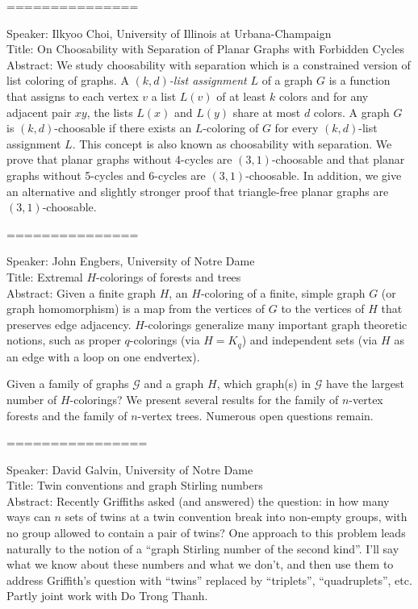 \documentclass[11pt]{article}
\begin{document}
===============

Speaker: Ilkyoo Choi, University of Illinois at Urbana-Champaign\\
Title:  On Choosability with Separation of Planar Graphs with Forbidden
Cycles \\
Abstract:  We study choosability with separation which is a constrained
version of list coloring of graphs. A \emph{$(k,d)$-list assignment} $L$ of
a graph $G$ is a function that assigns to each vertex $v$ a list $L(v)$ of
at least $k$ colors and for any adjacent pair $xy$, the lists $L(x)$ and
$L(y)$ share at most $d$ colors. A graph $G$ is $(k,d)$-choosable if there
exists an $L$-coloring of $G$ for every $(k,d)$-list assignment $L$. This
concept is also known as choosability with separation. We prove that planar
graphs without 4-cycles are $(3,1)$-choosable and that planar graphs without
5-cycles and 6-cycles are $(3,1)$-choosable. In addition, we give an
alternative and slightly stronger proof that triangle-free planar graphs are
$(3,1)$-choosable. 


===============

Speaker: John Engbers, University of Notre Dame\\
Title:  Extremal $H$-colorings of forests and trees \\
Abstract:  Given a finite graph $H$, an $H$-coloring of a finite, simple
graph $G$ (or graph homomorphism) is a map from the vertices of $G$ to the
vertices of $H$ that preserves edge adjacency.  $H$-colorings generalize
many important graph theoretic notions, such as proper $q$-colorings (via $H
= K_{q}$) and independent sets (via $H$ as an edge with a loop on one
endvertex).

Given a family of graphs $\mathcal{G}$ and a graph $H$, which graph(s) in
$\mathcal{G}$ have the largest number of $H$-colorings?  We present several
results for the family of $n$-vertex forests and the family of $n$-vertex
trees.  Numerous open questions remain.


================

Speaker: David Galvin, University of Notre Dame\\
Title: Twin conventions and graph Stirling numbers \\
Abstract:  Recently Griffiths asked (and answered) the question: in how many
ways can $n$ sets of twins at a twin convention break into non-empty groups,
with no group allowed to contain a pair of twins? One approach to this
problem leads naturally to the notion of a ``graph Stirling number of the
second kind''. I'll say what we know about these numbers and what we don't,
and then use them to address Griffith's question with ``twins'' replaced by
``triplets'', ``quadruplets'', etc. Partly joint work with Do Trong Thanh.
\end{document}
